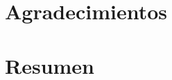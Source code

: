 \documentclass[11pt]{report}
\begin{document}
	

	\pagestyle{empty}
    
    \pagestyle{plain}

	\chapter*{Agradecimientos}
	\chapter*{Resumen}
    
	\tableofcontents
	\listoftables	
	\listoffigures

	\newpage
	\pagestyle{fancy} %
	
    
    
    
	
    
	
	
	
	
	\appendix
	\renewcommand{\chaptertitlename}{Anexo}
    
\end{document}
